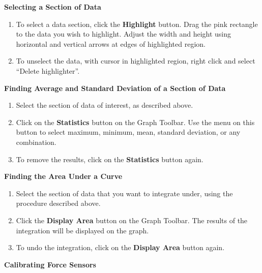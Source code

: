 \bigskip
\vspace{5mm}
\textbf{Selecting a Section of Data}

\begin{enumerate}
\item To select a data section, click the \textbf{Highlight} button.  Drag the pink rectangle to the data you wish to highlight.  Adjust the width and height using horizontal and vertical arrows at edges of highlighted region.
\item To unselect the data, with cursor in highlighted region, right click and select ``Delete highlighter''.
\end{enumerate}
\vspace{5mm}
\textbf{Finding Average and Standard Deviation of a Section of Data}

\begin{enumerate}
\item Select the section of data of interest, as described above.
\item Click on the \textbf{Statistics} button on the Graph Toolbar. Use the menu on this button to select maximum, minimum, mean, standard deviation, or any combination.
\item To remove the results, click on the \textbf{Statistics} button again.
\end{enumerate}


\pagebreak[2]
\vspace{5mm}
\textbf{Finding the Area Under a Curve}

\begin{enumerate}
\item Select the section of data that you want to integrate under, using the procedure described above.
\item Click the \textbf{Display Area} button on the Graph Toolbar.
The results of the integration will be displayed on the graph.
\item To undo the integration, click on the \textbf{Display Area} button again.
\end{enumerate}

\pagebreak[2]

\textbf{Calibrating Force Sensors}

